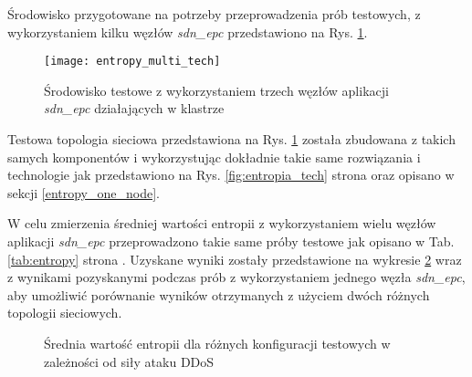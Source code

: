 Środowisko przygotowane na potrzeby przeprowadzenia prób testowych, z
wykorzystaniem kilku węzłów \textit{sdn\_epc} przedstawiono na Rys.
\ref{fig:entropy_multi_tech}.

\begin{figure}[h]
\centering
\texttt{[image: entropy\_multi\_tech]}
\caption{Środowisko testowe z wykorzystaniem trzech węzłów aplikacji
  \textit{sdn\_epc} działających w klastrze}
\label{fig:entropy_multi_tech}
\end{figure}

Testowa topologia sieciowa przedstawiona na Rys. \ref{fig:entropy_multi_tech}
została zbudowana z takich samych komponentów i wykorzystując dokładnie takie
same rozwiązania i technologie jak przedstawiono na Rys. \ref{fig:entropia_tech}
strona \pageref{fig:entropia_tech} oraz opisano w sekcji \ref{entropy_one_node}.

W celu zmierzenia średniej wartości entropii z wykorzystaniem wielu węzłów
aplikacji \textit{sdn\_epc} przeprowadzono takie same próby testowe jak opisano
w Tab. \ref{tab:entropy} strona \pageref{tab:entropy}. Uzyskane wyniki zostały
przedstawione na wykresie \ref{plot:entropy_multi_node} wraz z wynikami
pozyskanymi podczas prób z wykorzystaniem jednego węzła \textit{sdn\_epc}, aby
umożliwić porównanie wyników otrzymanych z użyciem dwóch różnych topologii
sieciowych.

\begin{figure}[h]
\centering
{}
\caption{Średnia wartość entropii dla różnych konfiguracji testowych w
  zależności od siły ataku DDoS}
\label{plot:entropy_multi_node}
\end{figure}

